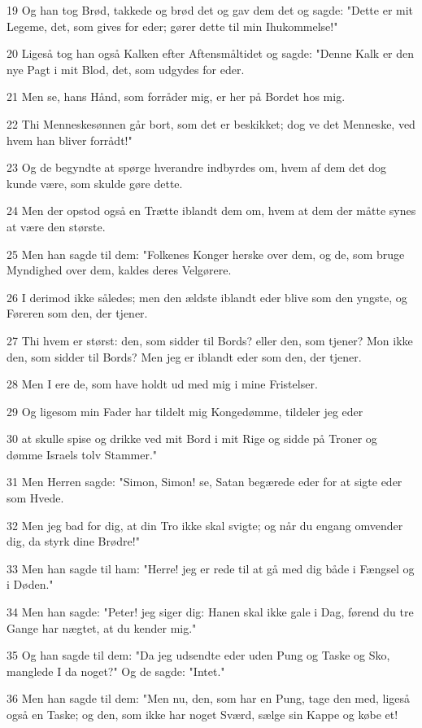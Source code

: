 \par 19 Og han tog Brød, takkede og brød det og gav dem det og sagde: "Dette er mit Legeme, det, som gives for eder; gører dette til min Ihukommelse!"
\par 20 Ligeså tog han også Kalken efter Aftensmåltidet og sagde: "Denne Kalk er den nye Pagt i mit Blod, det, som udgydes for eder.
\par 21 Men se, hans Hånd, som forråder mig, er her på Bordet hos mig.
\par 22 Thi Menneskesønnen går bort, som det er beskikket; dog ve det Menneske, ved hvem han bliver forrådt!"
\par 23 Og de begyndte at spørge hverandre indbyrdes om, hvem af dem det dog kunde være, som skulde gøre dette.
\par 24 Men der opstod også en Trætte iblandt dem om, hvem at dem der måtte synes at være den største.
\par 25 Men han sagde til dem: "Folkenes Konger herske over dem, og de, som bruge Myndighed over dem, kaldes deres Velgørere.
\par 26 I derimod ikke således; men den ældste iblandt eder blive som den yngste, og Føreren som den, der tjener.
\par 27 Thi hvem er størst: den, som sidder til Bords? eller den, som tjener? Mon ikke den, som sidder til Bords? Men jeg er iblandt eder som den, der tjener.
\par 28 Men I ere de, som have holdt ud med mig i mine Fristelser.
\par 29 Og ligesom min Fader har tildelt mig Kongedømme, tildeler jeg eder
\par 30 at skulle spise og drikke ved mit Bord i mit Rige og sidde på Troner og dømme Israels tolv Stammer."
\par 31 Men Herren sagde: "Simon, Simon! se, Satan begærede eder for at sigte eder som Hvede.
\par 32 Men jeg bad for dig, at din Tro ikke skal svigte; og når du engang omvender dig, da styrk dine Brødre!"
\par 33 Men han sagde til ham: "Herre! jeg er rede til at gå med dig både i Fængsel og i Døden."
\par 34 Men han sagde: "Peter! jeg siger dig: Hanen skal ikke gale i Dag, førend du tre Gange har nægtet, at du kender mig."
\par 35 Og han sagde til dem: "Da jeg udsendte eder uden Pung og Taske og Sko, manglede I da noget?" Og de sagde: "Intet."
\par 36 Men han sagde til dem: "Men nu, den, som har en Pung, tage den med, ligeså også en Taske; og den, som ikke har noget Sværd, sælge sin Kappe og købe et!
